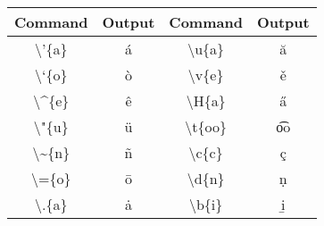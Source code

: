 \documentclass{article}
\newcommand*\co{\ttfamily\textbackslash}
\begin{document}
\sffamily
\begin{tabular}{cccc}
\toprule
\textbf{Command} & \textbf{Output} & \textbf{Command} & \textbf{Output} \\
\midrule
\co '\{a\} & \'{a}          & \co u\{a\}     & \u{a} \\
\co `\{o\} & \`{o}   & \co v\{e\}     & \v{e} \\
\co \^{ }\{e\} & \^{e} & \co H\{a\}     & \H{a} \\
\co"\{u\} & \"{u}   & \co t\{oo\}     & \t{oo} \\
\co\~{}\{n\} & \~{n} & \co c\{c\}     & \c{c} \\
\co =\{o\} & \={o}   & \co d\{n\}     & \d{n} \\
\co .\{a\} & \.{a}    & \co b\{i\}     & \b{i} \\
\bottomrule
\end{tabular}
\end{document}
